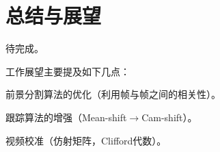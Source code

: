 \chapter{总结与展望}
\label{chap:conclusion}

待完成。

工作展望主要提及如下几点：

\begin{compactenum}
\item 前景分割算法的优化（利用帧与帧之间的相关性）。
\item 跟踪算法的增强（Mean-shift$\rightarrow$Cam-shift）。
\item 视频校准（仿射矩阵，Clifford代数）。
\end{compactenum}


